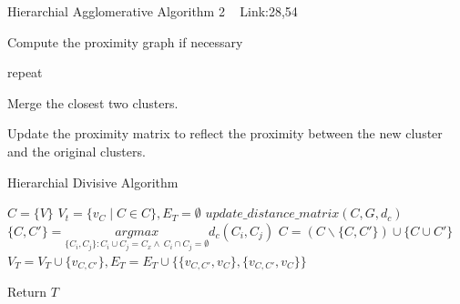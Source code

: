 \documentclass[a4paper]{article}
\begin{document}
\begin{algorithm}
   \caption{Hierarchial Agglomerative Algorithm 2 ~\cite{.} Link:28,54}
    \begin{algorithmic}[1]
    
       
       
    \State Compute the proximity graph if necessary
    
    \State repeat
    
    \State Merge the closest two clusters.
    
    \State Update the proximity matrix to reflect the proximity between the new cluster and the original
clusters.

 \EndWhile



    
    
    

\end{algorithmic}
\end{algorithm}



  \begin{algorithm}
   \caption{Hierarchial Divisive Algorithm ~\cite{hda1}}
    \begin{algorithmic}[1]
     \State $C = \{ V\} $ 
     \State $V_t = \{v_C\mid C \in C\},E_T = \emptyset$ 
     \State $update\_distance\_matrix(C,G,d_c)$
     \State $\{C,C'\} =  \underset{\{C_i,C_j\}  : C_i \cup C_j = C_x   \wedge \  C_i \cap C_j = \emptyset}{argmax} d_c (C_i,C_j)$
     \State $C = (C \backslash \{C,C'\}) \cup \{C \cup C'\}$ 
     \State $V_T = V_T \cup \{v_{C,C'}\},E_T = E_T \cup \{\{v_{C,C'} ,v_{C}\},\{v_{C,C'} ,v_{C}\}\}$ 
     \EndWhile
    
      
        
       
       \State Return $T$



 

\end{algorithmic}
\end{algorithm}
\end{document}
